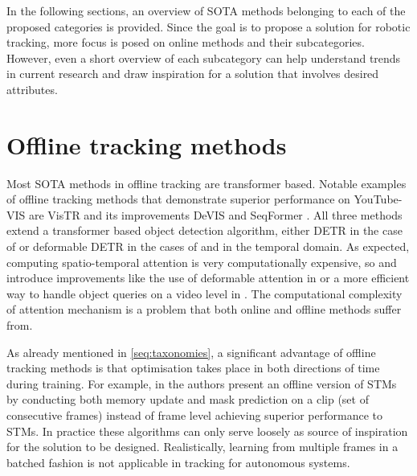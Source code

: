 In the following sections, an overview of \gls{SOTA} methods belonging to each of the proposed categories is provided. Since the goal is to propose a solution for robotic tracking, more focus is posed on online methods and their subcategories. However, even a short overview of each subcategory can help understand trends in current research and draw inspiration for a solution that involves desired attributes. \par




\section{Offline tracking methods}
Most SOTA methods in offline tracking are transformer based. Notable examples of offline tracking methods that demonstrate superior performance on YouTube-VIS \parencite{Yang2019vis} are VisTR\parencite{visTR} and its improvements DeVIS \parencite{devis} and SeqFormer \parencite{seqformer}. All three methods extend a transformer based object detection algorithm, either DETR \parencite{DETR} in the case of \parencite{visTR} or deformable DETR \parencite{zhu2020deformable} in the cases of \parencite{devis} and \parencite{seqformer} in the temporal domain. As expected, computing spatio-temporal attention is very computationally expensive, so \parencite{devis} and \parencite{seqformer} introduce improvements like the use of deformable attention in \parencite{devis} or a more efficient way to handle object queries on a video level in \parencite{segformer}. The computational complexity of attention mechanism is a problem that both online and offline methods suffer from. \par

 As already mentioned in \autoref{seq:taxonomies}, a significant advantage of offline tracking methods is that optimisation takes place in both directions of time during training. For example, in \parencite{park2022per} the authors present an offline version of STMs \parencite{stm} by conducting both memory update and mask prediction on a clip (set of consecutive frames) instead of frame level achieving superior performance to STMs. In practice  these algorithms can only serve loosely as source of inspiration for the solution to be designed. Realistically, learning from multiple frames in a batched fashion is not applicable in tracking for autonomous systems.\par

